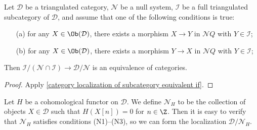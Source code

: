\begin{proposition}\label{triangle cat localization equivalence if resolution}
Let $\mathcal{D}$ be a triangulated category, $\mathcal{N}$ be a null system, $\mathcal{I}$ be a full triangulated subcategory of $\mathcal{D}$, and assume that one of the following conditions is true:
\begin{enumerate}
    \item[(a)] for any $X\in\Ob(\mathcal{D})$, there exists a morphism $X\to Y$ in $\mathcal{N}Q$ with $Y\in\mathcal{I}$;
    \item[(b)] for any $X\in\Ob(\mathcal{D})$, there exists a morphism $Y\to X$ in $\mathcal{N}Q$ with $Y\in\mathcal{I}$;
\end{enumerate}
Then $\mathcal{I}/(\mathcal{N}\cap\mathcal{I})\to\mathcal{D}/\mathcal{N}$ is an equivalence of categories.
\end{proposition}
\begin{proof}
Apply \cref{category localization of subcategory equivalent if}.
\end{proof}

\begin{example}
Let $H$ be a cohomological functor on $\mathcal{D}$. We define $\mathcal{N}_H$ to be the collection of objects $X\in\mathcal{D}$ such that $H(X[n])=0$ for $n\in\Z$. Then it is easy to verify that $\mathcal{N}_H$ satisfies conditions (N1)--(N3), so we can form the localization $\mathcal{D}/\mathcal{N}_H$.
\end{example}


